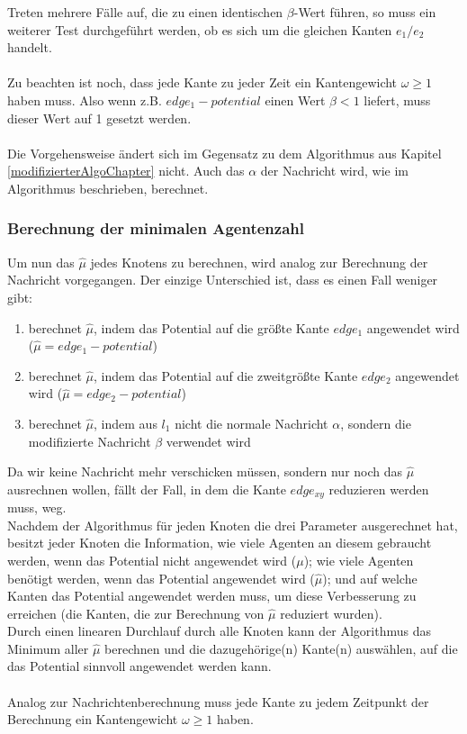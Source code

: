 	Treten mehrere Fälle auf, die zu einen identischen $\beta$-Wert führen, so muss ein weiterer Test durchgeführt werden, ob es sich um die gleichen Kanten $e_{1} / e_{2}$ handelt. 
	\\
	\\
	Zu beachten ist noch, dass jede Kante zu jeder Zeit ein Kantengewicht $\omega \geq 1$ haben muss. Also wenn z.B. $edge_{1} - potential$ einen Wert $\beta < 1$ liefert, muss dieser Wert auf 1 gesetzt werden.
	\\
	\\
	Die Vorgehensweise ändert sich im Gegensatz zu dem Algorithmus aus Kapitel \ref{modifizierterAlgoChapter} nicht. Auch das $\alpha$ der Nachricht wird, wie im Algorithmus beschrieben, berechnet.
	
	
	\subsubsection{Berechnung der minimalen Agentenzahl}
	
	Um nun das $\hat{\mu}$ jedes Knotens zu berechnen, wird analog zur Berechnung der Nachricht vorgegangen. Der einzige Unterschied ist, dass es einen Fall weniger gibt: 
	\begin{enumerate}
		\item berechnet $\hat{\mu}$, indem das Potential auf die größte Kante $edge_{1}$ angewendet wird ($\hat{\mu} = edge_{1} - potential$) 
		\item berechnet $\hat{\mu}$, indem das Potential auf die zweitgrößte Kante $edge_{2}$ angewendet wird ($\hat{\mu} = edge_{2} - potential$)
		\item berechnet $\hat{\mu}$, indem aus $l_{1}$ nicht die normale Nachricht $\alpha$, sondern die modifizierte Nachricht $\beta$ verwendet wird
	\end{enumerate}
	Da wir keine Nachricht mehr verschicken müssen, sondern nur noch das $\hat{\mu}$ ausrechnen wollen, fällt der Fall, in dem die Kante $edge_{xy}$ reduzieren werden muss, weg.\\
	Nachdem der Algorithmus für jeden Knoten die drei Parameter ausgerechnet hat, besitzt jeder Knoten die Information, wie viele Agenten an diesem gebraucht werden, wenn das Potential nicht angewendet wird ($\mu$); wie viele Agenten benötigt werden, wenn das Potential angewendet wird ($\hat{\mu}$); und auf welche Kanten das Potential angewendet werden muss, um diese Verbesserung zu erreichen (die Kanten, die zur Berechnung von $\hat{\mu}$ reduziert wurden).\\
	Durch einen linearen Durchlauf durch alle Knoten kann der Algorithmus das Minimum aller $\hat{\mu}$ berechnen und die dazugehörige(n) Kante(n) auswählen, auf die das Potential sinnvoll angewendet werden kann.
	\\
	\\
	Analog zur Nachrichtenberechnung muss jede Kante zu jedem Zeitpunkt der Berechnung ein Kantengewicht $\omega \geq 1$ haben. 
	
